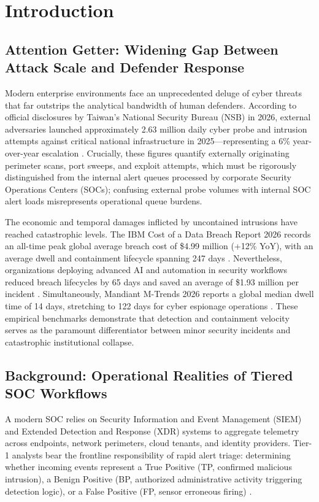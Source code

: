 \section{Introduction}

\subsection{Attention Getter: Widening Gap Between Attack Scale and Defender Response}
Modern enterprise environments face an unprecedented deluge of cyber threats that far outstrips the analytical bandwidth of human defenders. According to official disclosures by Taiwan's National Security Bureau (NSB) in 2026, external adversaries launched approximately 2.63 million daily cyber probe and intrusion attempts against critical national infrastructure in 2025---representing a 6\% year-over-year escalation \cite{nsb2026taiwan}. Crucially, these figures quantify externally originating perimeter scans, port sweeps, and exploit attempts, which must be rigorously distinguished from the internal alert queues processed by corporate Security Operations Centers (SOCs); confusing external probe volumes with internal SOC alert loads misrepresents operational queue burdens.

The economic and temporal damages inflicted by uncontained intrusions have reached catastrophic levels. The IBM Cost of a Data Breach Report 2026 records an all-time peak global average breach cost of \$4.99 million (+12\% YoY), with an average dwell and containment lifecycle spanning 247 days \cite{ibm2026databreach}. Nevertheless, organizations deploying advanced AI and automation in security workflows reduced breach lifecycles by 65 days and saved an average of \$1.93 million per incident \cite{ibm2026databreach}. Simultaneously, Mandiant M-Trends 2026 reports a global median dwell time of 14 days, stretching to 122 days for cyber espionage operations \cite{mandiant2026mtrends}. These empirical benchmarks demonstrate that detection and containment velocity serves as the paramount differentiator between minor security incidents and catastrophic institutional collapse.

\subsection{Background: Operational Realities of Tiered SOC Workflows}
A modern SOC relies on Security Information and Event Management (SIEM) and Extended Detection and Response (XDR) systems to aggregate telemetry across endpoints, network perimeters, cloud tenants, and identity providers. Tier-1 analysts bear the frontline responsibility of rapid alert triage: determining whether incoming events represent a True Positive (TP, confirmed malicious intrusion), a Benign Positive (BP, authorized administrative activity triggering detection logic), or a False Positive (FP, sensor erroneous firing) \cite{alahmadi2022falsepositives}. 


